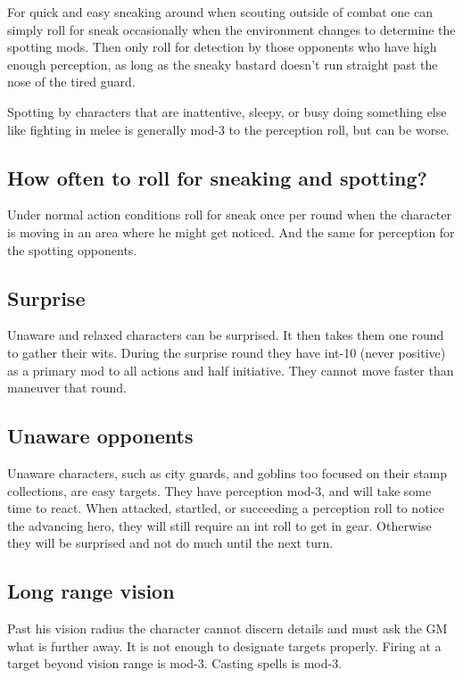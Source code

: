 For quick and easy sneaking around when scouting outside of combat one can simply roll for sneak occasionally when the environment changes to determine the spotting mods. Then only roll for detection by those opponents who have high enough perception, as long as the sneaky bastard doesn't run straight past the nose of the tired guard.

Spotting by characters that are inattentive, sleepy, or busy doing something else like fighting in melee is generally mod-3 to the perception roll, but can be worse.


\subsection*{How often to roll for sneaking and spotting?}
Under normal action conditions roll for sneak once per round when the character is moving in an area where he might get noticed. And the same for perception for the spotting opponents.


\subsection*{Surprise}
Unaware and relaxed characters can be surprised. It then takes them one round to gather their wits. During the surprise round they have int-10 (never positive) as a primary mod to all actions and half initiative. They cannot move faster than maneuver that round.


\subsection*{Unaware opponents}
Unaware characters, such as city guards, and goblins too focused on their stamp collections, are easy targets. They have perception mod-3, and will take some time to react. When attacked, startled, or succeeding a perception roll to notice the advancing hero, they will still require an int roll to get in gear. Otherwise they will be surprised and not do much until the next turn.


\subsection*{Long range vision}
Past his vision radius the character cannot discern details and must ask the GM what is further away. It is not enough to designate targets properly. Firing at a target beyond vision range is mod-3. Casting spells is mod-3.


